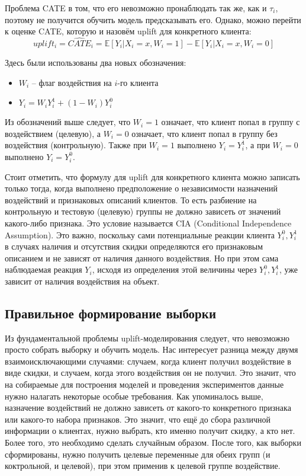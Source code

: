 Проблема CATE в том, что его невозможно пронаблюдать так же, как и $\tau_i$, поэтому не получится обучить модель предсказывать его. Однако, можно перейти к оценке CATE, которую и назовём uplift для конкретного клиента:
$$
    uplift_i = \widehat{CATE}_i = \mathbb{E} \left[ Y_i | X_i = x, W_i = 1 \right] - \mathbb{E} \left[ Y_i | X_i = x, W_i = 0 \right]
$$

Здесь были использованы два новых обозначения:
\begin{itemize}
    \item $W_i$ -- флаг воздействия на $i$-го клиента
    \item $Y_i = W_i Y_i^1 + (1 - W_i) Y_i^0$
\end{itemize}

Из обозначений выше следует, что $W_i = 1$ означает, что клиент попал в группу с воздействием (целевую), а $W_i = 0$ означает, что клиент попал в группу без воздействия (контрольную). Также при $W_i = 1$ выполнено $Y_i = Y_i^1$, а при $W_i = 0$ выполнено $Y_i = Y_i^0$.

Стоит отметить, что формулу для uplift для конкретного клиента можно записать только тогда, когда выполнено предположение о независимости назначений воздействий и признаковых описаний клиентов. То есть разбиение на контрольную и тестовую (целевую) группы не должно зависеть от значений какого-либо признака. Это условие называется CIA (Conditional Independence Assumption). Это важно, поскольку сами потенциальные реакции клиента $Y_i^0, Y_i^1$ в случаях наличия и отсутствия скидки определяются его признаковым описанием и не зависят от наличия данного воздействия. Но при этом сама наблюдаемая реакция $Y_i$, исходя из определения этой величины через $Y_i^0, Y_i^1$, уже зависит от наличия воздействия на объект.














\subsection{Правильное формирование выборки}

Из фундаментальной проблемы uplift-моделирования следует, что невозможно просто собрать выборку и обучить модель. Нас интересует разница между двумя взаимоисключающими случаями: случаем, когда клиент получил воздействие в виде скидки, и случаем, когда этого воздействия он не получил. Это значит, что на собираемые для построения моделей и проведения экспериментов данные нужно налагать некоторые особые требования. Как упоминалось выше, назначение воздействий не должно зависеть от какого-то конкретного признака или какого-то набора признаков. Это значит, что ещё до сбора различной информации о клиентах, нужно выбрать, кто именно получит скидку, а кто нет. Более того, это необходимо сделать случайным образом. После того, как выборки сформированы, нужно получить целевые переменные для обеих групп (и коктрольной, и целевой), при этом применив к целевой группе воздействие.

